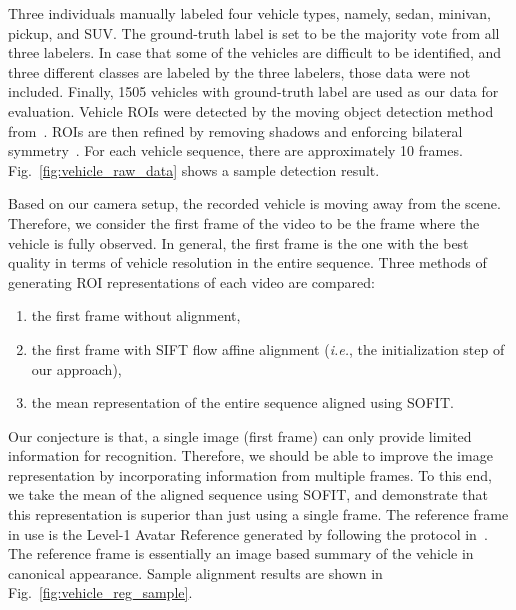 \documentclass[10pt,journal]{IEEEtran}
\begin{document}
Three individuals manually labeled four vehicle types, namely, sedan, minivan, pickup, and SUV. The ground-truth label is set to be the majority vote from all three labelers. In case that some of the vehicles are difficult to be identified, and three different classes are labeled by the three labelers, those data were not included. Finally, 1505 vehicles with ground-truth label are used as our data for evaluation. Vehicle ROIs were detected by the moving object detection method from~\cite{Thakoor05}. ROIs are then refined by removing shadows and enforcing bilateral symmetry~\cite{Thakoor13}. For each vehicle sequence, there are approximately 10 frames. Fig.~\ref{fig:vehicle_raw_data} shows a sample detection result.  

Based on our camera setup, the recorded vehicle is moving away from the scene. Therefore, we consider the first frame of the video to be the frame where the vehicle is fully observed. In general, the first frame is the one with the best quality in terms of vehicle resolution in the entire sequence. Three methods of generating ROI representations of each video are compared: 
\begin{enumerate}
\item the first frame without alignment, 
\item the first frame with SIFT flow affine alignment (\textit{i.e.}, the initialization step of our approach), 
\item the mean representation of the entire sequence aligned using SOFIT. 
\end{enumerate}

Our conjecture is that, a single image (first frame) can only provide limited information for recognition. Therefore, we should be able to improve the image representation by incorporating information from multiple frames. To this end, we take the mean of the aligned sequence using SOFIT, and demonstrate that this representation is superior than just using a single frame. The reference frame in use is the Level-1 Avatar Reference generated by following the protocol in~\cite{Yang_SMCB12}. The reference frame is essentially an image based summary of the vehicle in canonical appearance. Sample alignment results are shown in Fig.~\ref{fig:vehicle_reg_sample}.
\end{document}
